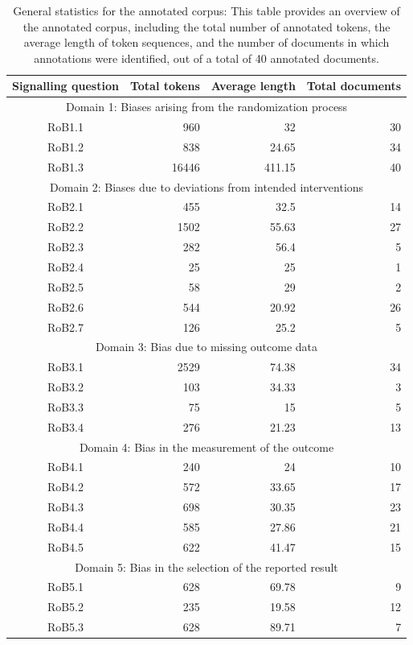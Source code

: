 \documentclass[sn-mathphys,Numbered]{sn-jnl}%
\theoremstyle{thmstyleone}%
\theoremstyle{thmstyletwo}%
\theoremstyle{thmstylethree}%
\begin{document}
%
%
%
\begin{table}[htb]
    \centering
    \caption{General statistics for the annotated corpus: This table provides an overview of the annotated corpus, including the total number of annotated tokens, the average length of token sequences, and the number of documents in which annotations were identified, out of a total of 40 annotated documents.}
    \label{table:stats}
    \begin{tabular}{crrr}
    \toprule[1.0pt]
        Signalling question & Total tokens & Average length & Total documents \\
    \midrule[1.0pt]
        \multicolumn{4}{c}{Domain 1: Biases arising from the randomization process} \\
        \hline
        RoB1.1 & 960 & 32 & 30 \\
        RoB1.2 & 838 & 24.65 & 34 \\
        RoB1.3 & 16446 & 411.15 & 40 \\
        \hline
        \multicolumn{4}{c}{Domain 2: Biases due to deviations from intended interventions} \\
        \hline
        RoB2.1 & 455 & 32.5 & 14 \\
        RoB2.2 & 1502 & 55.63 & 27 \\
        RoB2.3 & 282 & 56.4 & 5 \\
        RoB2.4 & 25 & 25 & 1 \\
        RoB2.5 & 58 & 29 & 2 \\
        RoB2.6 & 544 & 20.92 & 26 \\
        RoB2.7 & 126 & 25.2 & 5 \\
        \hline
        \multicolumn{4}{c}{Domain 3: Bias due to missing outcome data} \\
        \hline
        RoB3.1 & 2529 & 74.38 & 34 \\
        RoB3.2 & 103 & 34.33 & 3 \\
        RoB3.3 & 75 & 15 & 5 \\
        RoB3.4 & 276 & 21.23 & 13 \\
        \hline
        \multicolumn{4}{c}{Domain 4: Bias in the measurement of the outcome} \\
        \hline
        RoB4.1 & 240 & 24 & 10 \\
        RoB4.2 & 572 & 33.65 & 17 \\
        RoB4.3 & 698 & 30.35 & 23 \\
        RoB4.4 & 585 & 27.86 & 21 \\
        RoB4.5 & 622 & 41.47 & 15 \\
        \hline
        \multicolumn{4}{c}{Domain 5: Bias in the selection of the reported result} \\
        \hline
        RoB5.1 & 628 & 69.78 & 9 \\
        RoB5.2 & 235 & 19.58 & 12 \\
        RoB5.3 & 628 & 89.71 & 7 \\
    \bottomrule[1.0pt]
    \end{tabular}
\end{table}
%
%
%
\end{document}
